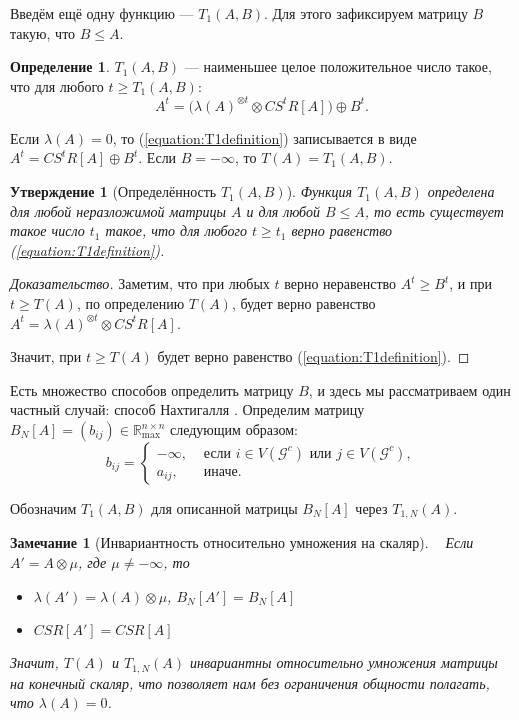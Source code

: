 \documentclass[12pt]{article}
\newtheorem{proposition}[theorem]{Утверждение}
\newtheorem{remark}[theorem]{Замечание}
\theoremstyle{definition}
\newtheorem{definition}[theorem]{Определение}
\begin{document}
Введём ещё одну функцию --- $T_1(A, B)$. Для этого зафиксируем матрицу $B$ такую, что $B \le A$.

\begin{definition} \cite[страница 165]{15WeakCSRExpantion}
\label{T1definition}
$T_1(A, B)$ --- наименьшее целое положительное число такое, что для любого $t \ge T_1(A, B)$:
\begin{equation}
\label{equation:T1definition}
    A^t = \big(\lambda(A)^{\otimes t} \otimes CS^tR[A] \big) \oplus B^t.
\end{equation}
\end{definition}

Если $\lambda(A) = 0$, то (\ref{equation:T1definition}) записывается в виде $A^t = CS^tR[A] \oplus B^t$. Если $B = -\infty$, то $T(A) = T_1(A, B)$.

\begin{proposition} [Определённость $T_1(A, B)$]
Функция $T_1(A, B)$ определена для любой неразложимой матрицы $A$ и для любой $B \le A$, то есть существует такое число $t_1$ такое, что для любого $t \ge t_1$ верно равенство (\ref{equation:T1definition}).
\end{proposition}
\begin{proof}[Доказательство]
Заметим, что при любых $t$ верно неравенство $A^t \ge B^t$, и при $t \ge T(A)$, по определению $T(A)$, будет верно равенство $A^t = \lambda(A)^{\otimes t} \otimes CS^tR[A]$.

Значит, при $t \ge T(A)$ будет верно равенство (\ref{equation:T1definition}).
\end{proof}

Есть множество способов определить матрицу $B$, и здесь мы рассматриваем один частный случай: способ Нахтигалля \cite[страница 170]{15WeakCSRExpantion}. Определим матрицу $B_N[A] = (b_{ij}) \in \mathbb{R}_{\max}^{n \times n}$ следующим образом:
\begin{equation*}
    b_{ij} = 
    \begin{cases}
        -\infty,& \text{ если $i \in V(\mathcal{G}^c)$ или $j\in V(\mathcal{G}^c)$}, \\
        a_{ij},& \text{ иначе.}
    \end{cases}
\end{equation*}

Обозначим $T_1(A, B)$ для описанной матрицы $B_N[A]$ через $T_{1, N}(A)$.

\begin{remark} [Инвариантность относительно умножения на скаляр]\cite[страница 287]{bounds} { \ }
\label{invarianceOfT}
Если $A' = A \otimes \mu$, где $\mu \ne -\infty$, то

\begin{itemize}
	\item $\lambda(A') = \lambda(A) \otimes \mu$, $B_N[A'] = B_N[A]$
	\item $CSR[A'] = CSR[A]$
\end{itemize}

Значит, $T(A)$ и $T_{1, N}(A)$ инвариантны относительно умножения матрицы на конечный скаляр, что позволяет нам без ограничения общности полагать, что $\lambda(A) = 0$.
\end{remark}
\end{document}
